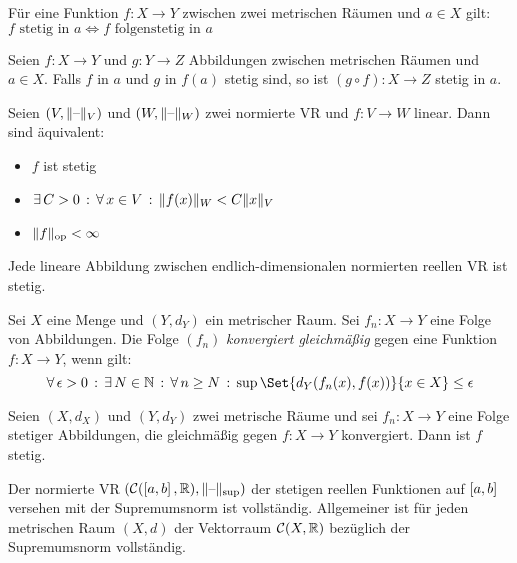 \documentclass{cheat-sheet}
\begin{document}
\begin{satz}
  Für eine Funktion $f : X \to Y$ zwischen zwei metrischen Räumen und $a \in X$ gilt:
  $f \text{ stetig in } a \iff f \text{ folgenstetig in } a$
\end{satz}

\begin{satz}
  Seien $f : X \to Y$ und $g : Y \to Z$ Abbildungen zwischen metrischen Räumen und $a \in X$. Falls $f$ in $a$ und $g$ in $f(a)$ stetig sind, so ist $(g \circ f) : X \to Z$ stetig in $a$.
\end{satz}


\begin{satz}
  Seien $(V, \lVert\text{--}\rVert_V)$ und $(W, \lVert\text{--}\rVert_W)$ zwei normierte VR und $f : V \to W$ linear. Dann sind äquivalent:
  \begin{itemize}
    \item $f$ ist stetig
    \item $\exists \, {C > 0} \,:\, \forall \, {x \in V} \,:\, \lVert f(x)\rVert_W < C \lVert x\rVert_V$
    \item $\lVert f\rVert_\text{op} < \infty$
  \end{itemize}
\end{satz}

\begin{kor}
  Jede lineare Abbildung zwischen endlich-dimensionalen normierten reellen VR ist stetig.
\end{kor}

\begin{defn}
  Sei $X$ eine Menge und $(Y, d_Y)$ ein metrischer Raum. Sei $f_n : X \to Y$ eine Folge von Abbildungen. Die Folge $(f_n)$ \emph{konvergiert gleichmäßig} gegen eine Funktion $f : X \to Y$, wenn gilt:
  \[ \fa{\epsilon > 0} \ex{N \in \N} \fa{n \ge N} \sup \Set{d_Y(f_n(x), f(x))}{x \in X} \le \epsilon \]
\end{defn}

\begin{satz}
  Seien $(X, d_X)$ und $(Y, d_Y)$ zwei metrische Räume und sei $f_n : X \to Y$ eine Folge stetiger Abbildungen, die gleichmäßig gegen $f : X \to Y$ konvergiert. Dann ist $f$ stetig.
\end{satz}

\begin{kor}
  Der normierte VR $(\mathcal{C}(\left[ a, b \right], \mathbb{R}), \lVert\text{--}\rVert_{\sup})$ der stetigen reellen Funktionen auf $\left[ a, b \right]$ versehen mit der Supremumsnorm ist vollständig. Allgemeiner ist für jeden metrischen Raum $(X, d)$ der Vektorraum $\mathcal{C}(X, \mathbb{R})$ bezüglich der Supremumsnorm vollständig.
\end{kor}
\end{document}
